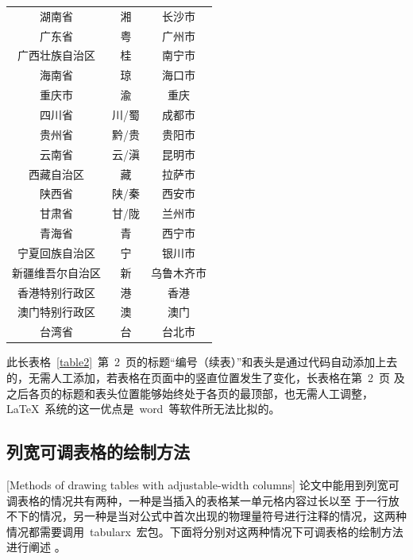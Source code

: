 \begin{longtable}{ccc}
湖南省 & 湘 & 长沙市\\
广东省 & 粤 & 广州市\\
广西壮族自治区 & 桂 & 南宁市\\
海南省 & 琼 & 海口市\\
重庆市 & 渝 & 重庆\\
四川省 & 川/蜀 & 成都市\\
贵州省 & 黔/贵 & 贵阳市\\
云南省 & 云/滇 & 昆明市\\
西藏自治区 & 藏 & 拉萨市\\
陕西省 & 陕/秦 & 西安市\\
甘肃省 & 甘/陇 & 兰州市\\
青海省 & 青 & 西宁市\\
宁夏回族自治区 & 宁 & 银川市\\
新疆维吾尔自治区 & 新 & 乌鲁木齐市\\
香港特别行政区 & 港 & 香港\\
澳门特别行政区 & 澳 & 澳门\\
台湾省 & 台 & 台北市\\
\end{longtable}\normalsize
\vspace{-1em}

此长表格~\ref{table2}~第~2~页的标题“编号（续表）”和表头是通过代码自动添加上去的，无需人工添加，若表格在页面中的竖直位置发生了变化，长表格在第~2~页
及之后各页的标题和表头位置能够始终处于各页的最顶部，也无需人工调整，\LaTeX~系统的这一优点是~word~等软件所无法比拟的。

\subsection{列宽可调表格的绘制方法}[Methods of drawing tables with adjustable-width columns]
论文中能用到列宽可调表格的情况共有两种，一种是当插入的表格某一单元格内容过长以至
于一行放不下的情况，另一种是当对公式中首次出现的物理量符号进行注释的情况，这两种
情况都需要调用~tabularx~宏包。下面将分别对这两种情况下可调表格的绘制方法进行阐述
。
